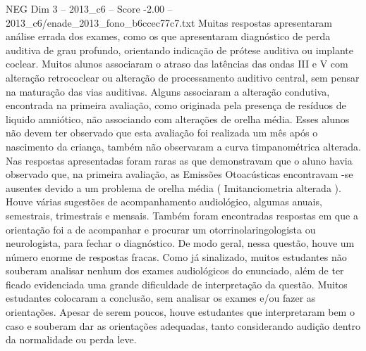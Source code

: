 \begin{textsample}{NEG Dim 3 – 2013\_c6 – Score -2.00 – 2013\_c6/enade\_2013\_fono\_b6ccec77c7.txt}
Muitas respostas apresentaram análise errada dos exames, como os que apresentaram diagnóstico de perda auditiva de grau profundo, orientando indicação de prótese auditiva ou implante coclear.
Muitos alunos associaram o atraso das latências das ondas III e V com alteração retrococlear ou alteração de processamento auditivo central, sem pensar na maturação das vias auditivas.
Alguns associaram a alteração condutiva, encontrada na primeira avaliação, como originada pela presença de resíduos de liquido amniótico, não associando com alterações de orelha média.
Esses alunos não devem ter observado que esta avaliação foi realizada um mês após o nascimento da criança, também não observaram a curva timpanométrica alterada.
Nas respostas apresentadas foram raras as que demonstravam que o aluno havia observado que, na primeira avaliação, as Emissões Otoacústicas encontravam -se ausentes devido a um problema de orelha média ( Imitanciometria alterada ).
Houve várias sugestões de acompanhamento audiológico, algumas anuais, semestrais, trimestrais e mensais.
Também foram encontradas respostas em que a orientação foi a de acompanhar e procurar um otorrinolaringologista ou neurologista, para fechar o diagnóstico.
De modo geral, nessa questão, houve um número enorme de respostas fracas.
Como já sinalizado, muitos estudantes não souberam analisar nenhum dos exames audiológicos do enunciado, além de ter ficado evidenciada uma grande dificuldade de interpretação da questão.
Muitos estudantes colocaram a conclusão, sem analisar os exames e/ou fazer as orientações.
Apesar de serem poucos, houve estudantes que interpretaram bem o caso e souberam dar as orientações adequadas, tanto considerando audição dentro da normalidade ou perda leve.

\end{textsample}
